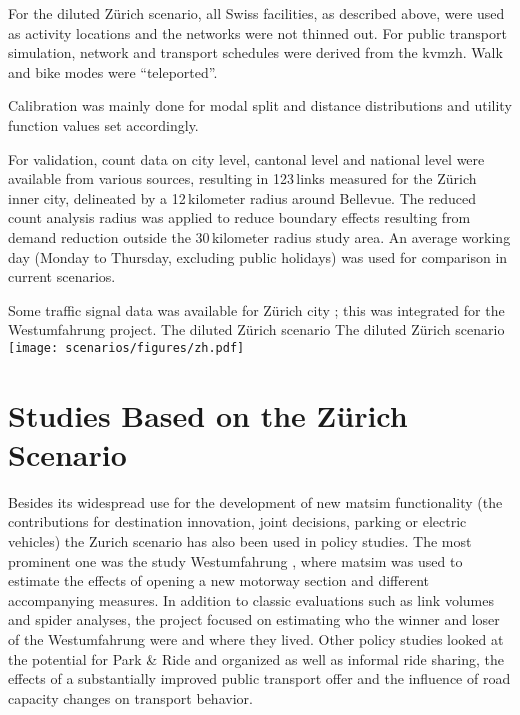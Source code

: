 For the diluted Zürich scenario, all Swiss facilities, as described above, were used as activity locations and the networks were not thinned out. For public transport simulation, network and transport schedules were derived from the \gls{kvmzh}. Walk and bike modes were ``\gls{teleported}''. 

Calibration was mainly done for modal split and distance distributions and utility function values set accordingly.

For validation, count data on city level, cantonal level and national level \citep[][]{ASTRA_Webpage_2006} were available from various sources, resulting in 123\,links measured for the Zürich inner city, delineated by a 12\,kilometer radius around Bellevue. The reduced count analysis radius was applied to reduce boundary effects resulting from demand reduction outside the 30\,kilometer radius study area. An average working day (Monday to Thursday, excluding public holidays) was used for comparison in current scenarios.

Some traffic signal data was available for Zürich city \citep[][]{STAPOZH-DAV_unpub_gtZH_2008}; this was integrated for the Westumfahrung project.
%
\createfigure%
{The diluted Zürich scenario}%
{The diluted Zürich scenario}%
{\label{fig:zurichScenario}}%
{\texttt{[image: scenarios/figures/zh.pdf]}}%
{}

\section{Studies Based on the Zürich Scenario}
Besides its widespread use for the development of new \gls{matsim} functionality (\eg the contributions for destination innovation, joint decisions, parking or electric vehicles) the Zurich scenario has also been used in policy studies. 
The most prominent one was the study Westumfahrung \citep{BalmerEtAl_ResRep_bdktzrh_2009}, where \gls{matsim} was used to estimate the effects of opening a new motorway section and different accompanying measures. 
In addition to classic evaluations such as link volumes and spider analyses, the project focused on estimating who the winner and loser of the Westumfahrung were and where they lived. 
Other policy studies looked at the potential for Park \& Ride and organized as well as informal ride sharing, the effects of a substantially improved public transport offer and the influence of road capacity changes on transport behavior. 

